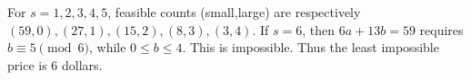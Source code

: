 For $s=1,2,3,4,5$, feasible counts (small,large) are respectively $(59,0),(27,1),(15,2),(8,3),(3,4)$. If $s=6$, then $6a+13b=59$ requires $b\equiv5\pmod6$, while $0\le b\le4$. This is impossible. Thus the least impossible price is $\boxed6$ dollars.
